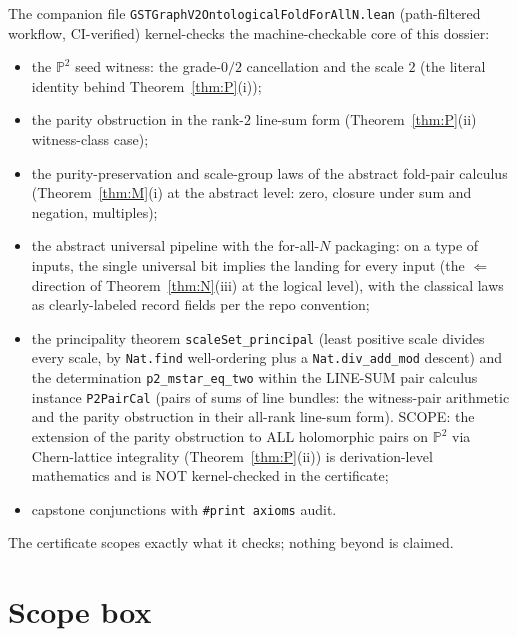 \documentclass[11pt]{article}
\newcommand{\Pp}{\mathbb{P}}
\begin{document}
The companion file \texttt{GSTGraphV2OntologicalFoldForAllN.lean}
(path-filtered workflow, CI-verified) kernel-checks the machine-checkable
core of this dossier:
\begin{itemize}
\item the $\Pp^2$ seed witness: the grade-$0/2$ cancellation and the scale
$2$ (the literal identity behind Theorem~\ref{thm:P}(i));
\item the parity obstruction in the rank-$2$ line-sum form
(Theorem~\ref{thm:P}(ii) witness-class case);
\item the purity-preservation and scale-group laws of the abstract fold-pair
calculus (Theorem~\ref{thm:M}(i) at the abstract level: zero, closure under
sum and negation, multiples);
\item the abstract universal pipeline with the for-all-$N$ packaging: on a
type of inputs, the single universal bit implies the landing for every input
(the $\Leftarrow$ direction of Theorem~\ref{thm:N}(iii) at the logical
level), with the classical laws as clearly-labeled record fields per the repo
convention;
\item the principality theorem \texttt{scaleSet\_principal} (least positive
scale divides every scale, by \texttt{Nat.find} well-ordering plus a
\texttt{Nat.div\_add\_mod} descent) and the determination
\texttt{p2\_mstar\_eq\_two} within the LINE-SUM pair calculus instance
\texttt{P2PairCal} (pairs of sums of line bundles: the witness-pair
arithmetic and the parity obstruction in their all-rank line-sum form).
SCOPE: the extension of the parity obstruction to ALL holomorphic pairs on
$\Pp^2$ via Chern-lattice integrality (Theorem~\ref{thm:P}(ii)) is
derivation-level mathematics and is NOT kernel-checked in the certificate;
\item capstone conjunctions with \texttt{\#print axioms} audit.
\end{itemize}
The certificate scopes exactly what it checks; nothing beyond is claimed.

\section{Scope box}
\label{sec:scope}
\end{document}
